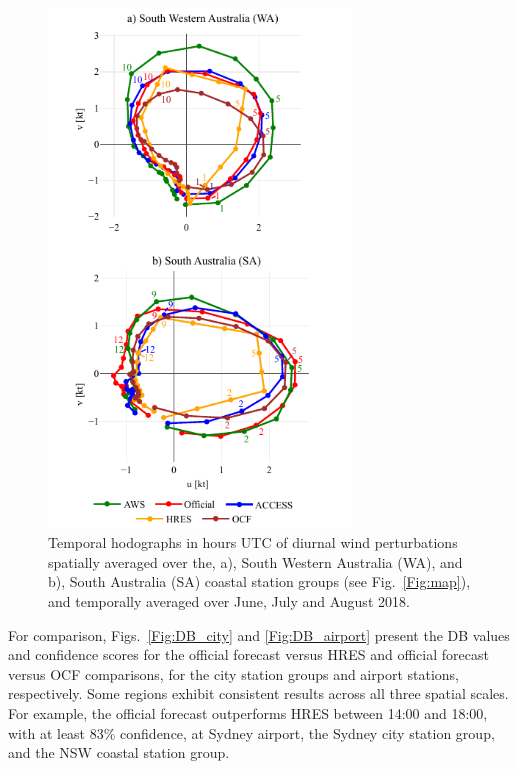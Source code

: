 \documentclass{ametsoc}
\begin{document}
\begin{figure}
\centering
\includegraphics[width=19pc]{clim_hodo.pdf}
\caption{Temporal hodographs in hours UTC of diurnal wind perturbations spatially averaged over the, a), South Western Australia (WA), and b), South Australia (SA) coastal station groups (see Fig.~\ref{Fig:map}), and temporally averaged over June, July and August 2018.}
\label{Fig:clim_hodo}
\end{figure}

For comparison, Figs.~\ref{Fig:DB_city} and \ref{Fig:DB_airport} present the DB values and confidence scores for the official forecast versus HRES and official forecast versus OCF comparisons, for the city station groups and airport stations, respectively. Some regions exhibit consistent results across all three spatial scales. For example, the official forecast outperforms HRES between 14:00 and 18:00, with at least $83\%$ confidence, at Sydney airport, the Sydney city station group, and the NSW coastal station group. 
\end{document}
